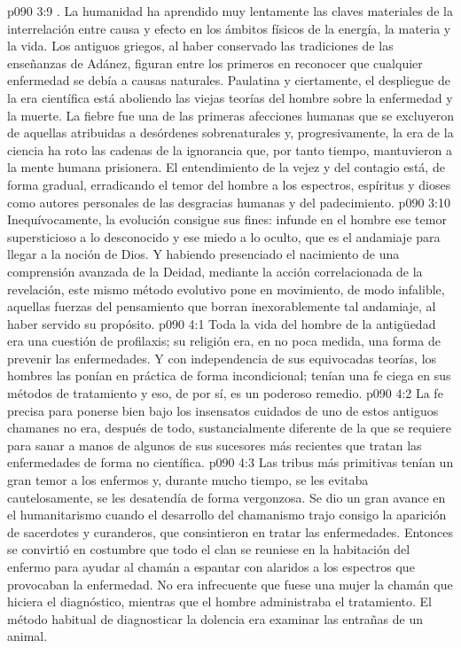 \vs p090 3:9 . La humanidad ha aprendido muy lentamente las claves materiales de la interrelación entre causa y efecto en los ámbitos físicos de la energía, la materia y la vida. Los antiguos griegos, al haber conservado las tradiciones de las enseñanzas de Adánez, figuran entre los primeros en reconocer que cualquier enfermedad se debía a causas naturales. Paulatina y ciertamente, el despliegue de la era científica está aboliendo las viejas teorías del hombre sobre la enfermedad y la muerte. La fiebre fue una de las primeras afecciones humanas que se excluyeron de aquellas atribuidas a desórdenes sobrenaturales y, progresivamente, la era de la ciencia ha roto las cadenas de la ignorancia que, por tanto tiempo, mantuvieron a la mente humana prisionera. El entendimiento de la vejez y del contagio está, de forma gradual, erradicando el temor del hombre a los espectros, espíritus y dioses como autores personales de las desgracias humanas y del padecimiento.
\vs p090 3:10 \pc Inequívocamente, la evolución consigue sus fines: infunde en el hombre ese temor supersticioso a lo desconocido y ese miedo a lo oculto, que es el andamiaje para llegar a la noción de Dios. Y habiendo presenciado el nacimiento de una comprensión avanzada de la Deidad, mediante la acción correlacionada de la revelación, este mismo método evolutivo pone en movimiento, de modo infalible, aquellas fuerzas del pensamiento que borran inexorablemente tal andamiaje, al haber servido su propósito.
\vs p090 4:1 Toda la vida del hombre de la antigüedad era una cuestión de profilaxis; su religión era, en no poca medida, una forma de prevenir las enfermedades. Y con independencia de sus equivocadas teorías, los hombres las ponían en práctica de forma incondicional; tenían una fe ciega en sus métodos de tratamiento y eso, de por sí, es un poderoso remedio.
\vs p090 4:2 \pc La fe precisa para ponerse bien bajo los insensatos cuidados de uno de estos antiguos chamanes no era, después de todo, sustancialmente diferente de la que se requiere para sanar a manos de algunos de sus sucesores más recientes que tratan las enfermedades de forma no científica.
\vs p090 4:3 \pc Las tribus más primitivas tenían un gran temor a los enfermos y, durante mucho tiempo, se les evitaba cautelosamente, se les desatendía de forma vergonzosa. Se dio un gran avance en el humanitarismo cuando el desarrollo del chamanismo trajo consigo la aparición de sacerdotes y curanderos, que consintieron en tratar las enfermedades. Entonces se convirtió en costumbre que todo el clan se reuniese en la habitación del enfermo para ayudar al chamán a espantar con alaridos a los espectros que provocaban la enfermedad. No era infrecuente que fuese una mujer la chamán que hiciera el diagnóstico, mientras que el hombre administraba el tratamiento. El método habitual de diagnosticar la dolencia era examinar las entrañas de un animal.
